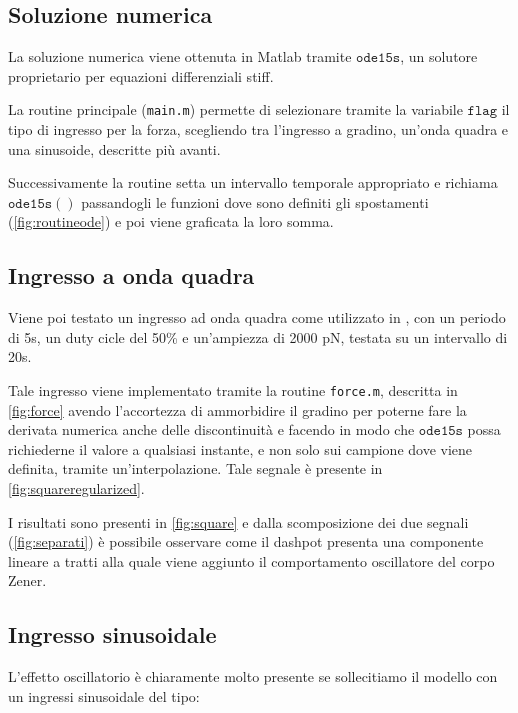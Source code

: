 \subsection{Soluzione numerica}

La soluzione numerica viene ottenuta in Matlab tramite $\mathtt{ode15s}$, un solutore proprietario per equazioni differenziali stiff.

La routine principale (\texttt{main.m}) permette di selezionare tramite la variabile $\mathtt{flag}$ il tipo di ingresso per la forza, scegliendo tra l'ingresso a gradino, un'onda quadra e una sinusoide, descritte più avanti.

Successivamente la routine setta un intervallo temporale appropriato e richiama $\mathtt{ode15s()}$ passandogli le funzioni dove sono definiti gli spostamenti (\cref{fig:routineode}) e poi viene graficata la loro somma.



\subsection{Ingresso a onda quadra}

Viene poi testato un ingresso ad onda quadra come utilizzato in \cite{bausch_local_1998}, con un periodo di 5s, un duty cicle del 50\% e un'ampiezza di 2000 pN, testata su un intervallo di 20s.

Tale ingresso viene implementato tramite la routine \texttt{force.m}, descritta in \cref{fig:force} avendo l'accortezza di ammorbidire il gradino per poterne fare la derivata numerica anche delle discontinuità e facendo in modo che $\mathtt{ode15s}$ possa richiederne il valore a qualsiasi instante, e non solo sui campione dove viene definita, tramite un'interpolazione.  Tale segnale è presente in \cref{fig:squareregularized}.

I risultati sono presenti in \cref{fig:square} e dalla scomposizione dei due segnali (\cref{fig:separati}) è possibile osservare come il dashpot presenta una componente lineare a tratti alla quale viene aggiunto il comportamento oscillatore del corpo Zener.



\subsection{Ingresso sinusoidale}

L'effetto oscillatorio è chiaramente molto presente se sollecitiamo il modello con un ingressi sinusoidale del tipo: 

